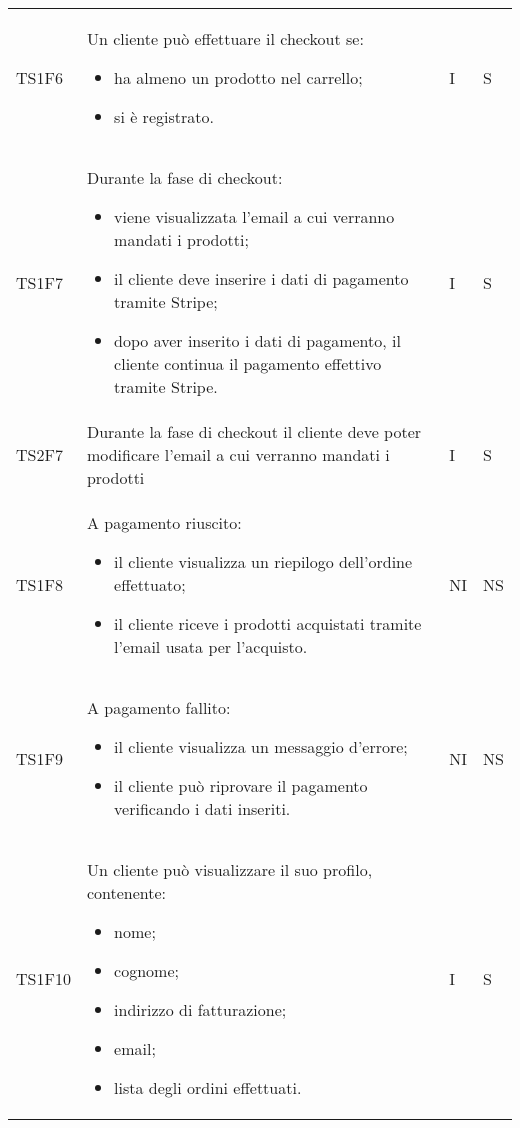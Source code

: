 {\begin{longtable}{C{2cm} C{9.6cm} C{1.5cm} C{1cm}}
TS1F6 & Un cliente può effettuare il checkout se:
\begin{itemize}
	\item ha almeno un prodotto nel carrello;
	\item si è registrato.
\end{itemize}
& I & S\\

TS1F7 & Durante la fase di checkout:
\begin{itemize}
	\item viene visualizzata l'email a cui verranno mandati i prodotti;
	\item il cliente deve inserire i dati di pagamento tramite Stripe;
	\item dopo aver inserito i dati di pagamento, il cliente continua il pagamento effettivo tramite Stripe.
\end{itemize}
& I & S\\

TS2F7 & Durante la fase di checkout il cliente deve poter modificare l'email a cui verranno mandati i prodotti
& I & S\\

TS1F8 & A pagamento riuscito:
\begin{itemize}
	\item il cliente visualizza un riepilogo dell'ordine effettuato;
	\item il cliente riceve i prodotti acquistati tramite l'email usata per l'acquisto.
\end{itemize}
& NI & NS\\

TS1F9 & A pagamento fallito:
\begin{itemize}
	\item il cliente visualizza un messaggio d'errore;
	\item il cliente può riprovare il pagamento verificando i dati inseriti.
\end{itemize}
& NI & NS\\


TS1F10 & Un cliente può visualizzare il suo profilo, contenente:
\begin{itemize}
	\item nome;
	\item cognome;
	\item indirizzo di fatturazione;
	\item email;
	\item lista degli ordini effettuati.
\end{itemize}
& I & S\\


\end{longtable}}

